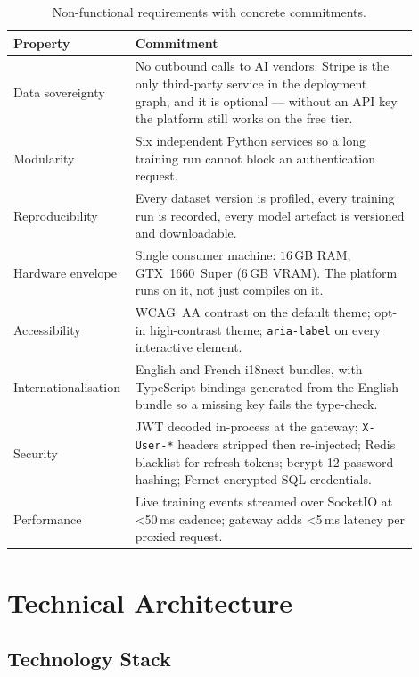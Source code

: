 \documentclass[12pt, a4paper, oneside]{report}
\begin{document}
\begin{table}[H]
\centering
\caption{Non-functional requirements with concrete commitments.}
\label{tab:nonfunctional_reqs}
\begin{tabular}{|p{0.22\linewidth}|L{0.68\linewidth}|}
\hline
\textbf{Property} & \textbf{Commitment} \\
\hline
Data sovereignty & No outbound calls to AI vendors. Stripe is the only third-party service in the deployment graph, and it is optional --- without an API key the platform still works on the free tier. \\ \hline
Modularity & Six independent Python services so a long training run cannot block an authentication request. \\ \hline
Reproducibility & Every dataset version is profiled, every training run is recorded, every model artefact is versioned and downloadable. \\ \hline
Hardware envelope & Single consumer machine: $16$\,GB RAM, GTX~1660~Super (6\,GB VRAM). The platform runs on it, not just compiles on it. \\ \hline
Accessibility & WCAG~AA contrast on the default theme; opt-in high-contrast theme; \texttt{aria-label} on every interactive element. \\ \hline
Internationalisation & English and French i18next bundles, with TypeScript bindings generated from the English bundle so a missing key fails the type-check. \\ \hline
Security & JWT decoded in-process at the gateway; \texttt{X-User-*} headers stripped then re-injected; Redis blacklist for refresh tokens; bcrypt-12 password hashing; Fernet-encrypted SQL credentials. \\ \hline
Performance & Live training events streamed over SocketIO at \textless50\,ms cadence; gateway adds \textless5\,ms latency per proxied request. \\
\hline
\end{tabular}
\end{table}

\section{Technical Architecture}

\subsection{Technology Stack}
\end{document}
